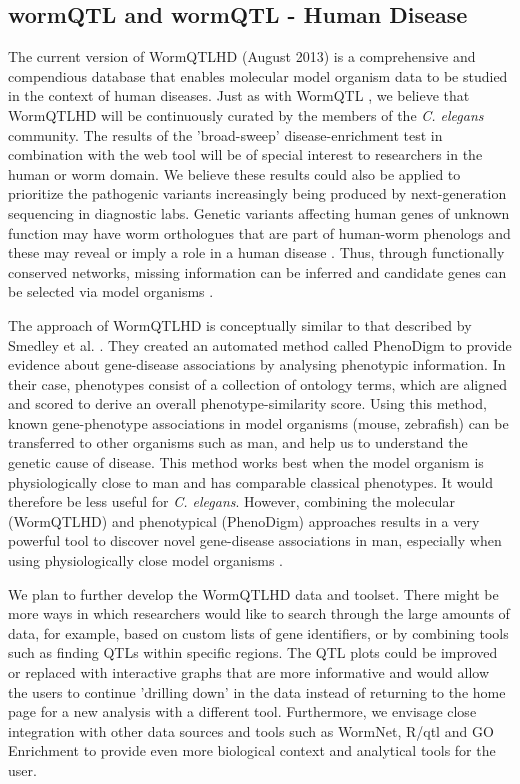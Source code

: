 \subsection{wormQTL and wormQTL - Human Disease}
The current version of WormQTLHD (August 2013) is a comprehensive and compendious database that 
enables molecular model organism data to be studied in the context of human diseases. Just as with 
WormQTL \cite{Snoek:2012}, we believe that WormQTLHD will be continuously curated by the members of 
the \emph{C. elegans} community. The results of the 'broad-sweep' disease-enrichment test in 
combination with the web tool will be of special interest to researchers in the human or worm 
domain. We believe these results could also be applied to prioritize the pathogenic variants 
increasingly being produced by next-generation sequencing in diagnostic labs. Genetic variants 
affecting human genes of unknown function may have worm orthologues that are part of human-worm 
phenologs and these may reveal or imply a role in a human disease \cite{Ostlund:2014}. Thus, 
through functionally conserved networks, missing information can be inferred and candidate genes 
can be selected via model organisms \cite{vanDerVelde:2014}.

The approach of WormQTLHD is conceptually similar to that described by Smedley et al. 
\cite{Smedley:2013}. They created an automated method called PhenoDigm to provide evidence about 
gene-disease associations by analysing phenotypic information. In their case, phenotypes consist of 
a collection of ontology terms, which are aligned and scored to derive an overall phenotype-similarity score. Using this 
method, known gene-phenotype associations in model organisms (mouse, zebrafish) can be transferred 
to other organisms such as man, and help us to understand the genetic cause of disease. This method 
works best when the model organism is physiologically close to man and has comparable classical 
phenotypes. It would therefore be less useful for \emph{C. elegans}. However, combining the molecular 
(WormQTLHD) and phenotypical (PhenoDigm) approaches results in a very powerful tool to discover 
novel gene-disease associations in man, especially when using physiologically close model organisms \cite{vanDerVelde:2014}.

We plan to further develop the WormQTLHD data and toolset. There might be more ways in which 
researchers would like to search through the large amounts of data, for example, based on custom 
lists of gene identifiers, or by combining tools such as finding QTLs within specific regions. 
The QTL plots could be improved or replaced with interactive graphs that are more informative and 
would allow the users to continue 'drilling down' in the data instead of returning to the home page 
for a new analysis with a different tool. Furthermore, we envisage close integration with other data 
sources and tools such as WormNet, R/qtl and GO Enrichment to provide even more biological context 
and analytical tools for the user.

